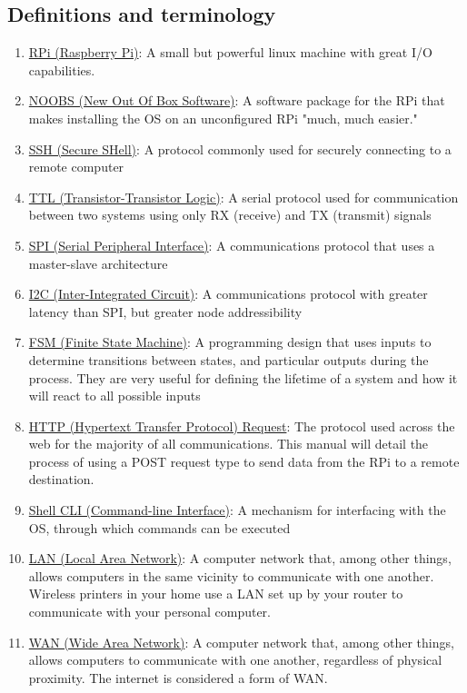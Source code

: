 \documentclass{article}
\newcommand{\createterm}[3]{
      \item \href{#1}{#2}: #3
} %
\begin{document}
  \subsection{Definitions and terminology}
    \begin{enumerate}
      \createterm{https://en.wikipedia.org/wiki/Raspberry\_Pi}{RPi (Raspberry Pi)}{A small but powerful linux machine with great I/O capabilities.}
      \createterm{https://www.raspberrypi.org/blog/introducing-noobs/}{NOOBS (New Out Of Box Software)}{A software package for the RPi that makes installing the OS on an unconfigured RPi "much, much easier."}
      \createterm{https://en.wikipedia.org/wiki/Secure\_Shell}{SSH (Secure SHell)}{A protocol commonly used for securely connecting to a remote computer}
      \createterm{https://en.wikipedia.org/wiki/Transistor\%E2\%80\%93transistor\_logic}{TTL (Transistor-Transistor Logic)}{A serial protocol used for communication between two systems using only RX (receive) and TX (transmit) signals}
      \createterm{https://en.wikipedia.org/wiki/Serial\_Peripheral\_Interface\_Bus}{SPI (Serial Peripheral Interface)}{A communications protocol that uses a master-slave architecture}
      \createterm{https://en.wikipedia.org/wiki/I\%C2\%B2C}{I2C (Inter-Integrated Circuit)}{A communications protocol with greater latency than SPI, but greater node addressibility}
      \createterm{https://en.wikipedia.org/wiki/Finite-state\_machine}{FSM (Finite State Machine)}{A programming design that uses inputs to determine transitions between states, and particular outputs during the process. They are very useful for defining the lifetime of a system and how it will react to all possible inputs}
      \createterm{https://en.wikipedia.org/wiki/Hypertext\_Transfer\_Protocol\#Request\_methods}{HTTP (Hypertext Transfer Protocol) Request}{The protocol used across the web for the majority of all communications. This manual will detail the process of using a POST request type to send data from the RPi to a remote destination.}
      \createterm{https://en.wikipedia.org/wiki/Command-line\_interface}{Shell CLI (Command-line Interface)}{A mechanism for interfacing with the OS, through which commands can be executed}
      \createterm{https://en.wikipedia.org/wiki/Local\_area\_network}{LAN (Local Area Network)}{A computer network that, among other things, allows computers in the same vicinity to communicate with one another. Wireless printers in your home use a LAN set up by your router to communicate with your personal computer.}
      \createterm{https://en.wikipedia.org/wiki/Wide\_area\_network}{WAN (Wide Area Network)}{A computer network that, among other things, allows computers to communicate with one another, regardless of physical proximity. The internet is considered a form of WAN.}
    \end{enumerate}
\end{document}
